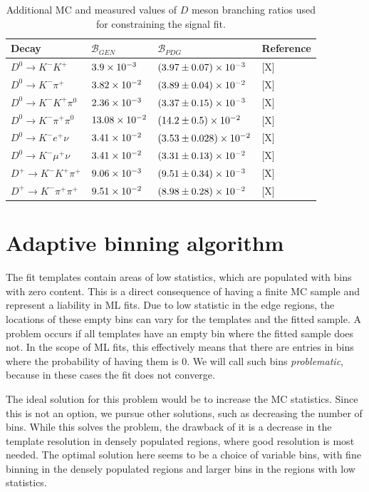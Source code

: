 \begin{table}[!htbp]
	\centering
	\begin{tabular}{|l|l|l|l|}
		\hline
		Decay & $\mathcal{B}_{GEN}$ & $\mathcal{B}_{PDG}$ & Reference \\
		\hline
        $D^0 \to K^-K^+$ & $3.9\times 10^{-3}$ & $(3.97\pm0.07)\times 10^{-3}$ & [X] \\
		\hline
		$D^0 \to K^-\pi^+$ & $3.82\times 10^{-2}$ & $(3.89\pm0.04)\times 10^{-2}$ & [X] \\
		\hline
        $D^0 \to K^-K^+\pi^0$ & $2.36\times 10^{-3}$ & $(3.37\pm0.15)\times 10^{-3}$ & [X] \\
		\hline
		$D^0 \to K^-\pi^+\pi^0$ & $13.08\times 10^{-2}$ & $(14.2\pm0.5)\times 10^{-2}$ & [X] \\
		\hline
        $D^0 \to K^-e^+\nu$ & $3.41\times 10^{-2}$ & $(3.53\pm0.028)\times 10^{-2}$ & [X] \\
		\hline
		$D^0 \to K^-\mu^+\nu$ & $3.41\times 10^{-2}$ & $(3.31\pm0.13)\times 10^{-2}$ & [X] \\
		\hline
        $D^+ \to K^-K^+\pi^+$ & $9.06\times 10^{-3}$ & $(9.51\pm0.34)\times 10^{-3}$ & [X] \\
		\hline
		$D^+ \to K^-\pi^+\pi^+$ & $9.51\times 10^{-2}$ & $(8.98\pm0.28)\times 10^{-2}$ & [X] \\
		\hline
	\end{tabular}
	\caption{Additional MC and measured values of $D$ meson branching ratios used for constraining the signal fit.}
	\label{tab:sig_br_constraint_table}
\end{table}

\section{Adaptive binning algorithm}\label{sec:adaptive-binning-algorithm}

The fit templates contain areas of low statistics, which are populated with bins with zero content. This is a direct consequence of having a finite MC sample and represent a liability in ML fits. Due to low statistic in the edge regions, the locations of these empty bins can vary for the templates and the fitted sample. A problem occurs if all templates have an empty bin where the fitted sample does not. In the scope of ML fits, this effectively means that there are entries in bins where the probability of having them is $0$. We will call such bins \textit{problematic}, because in these cases the fit does not converge.

The ideal solution for this problem would be to increase the MC statistics. Since this is not an option, we pursue other solutions, such as decreasing the number of bins. While this solves the problem, the drawback of it is a decrease in the template resolution in densely populated regions, where good resolution is most needed. The optimal solution here seems to be a choice of variable bins, with fine binning in the densely populated regions and larger bins in the regions with low statistics.

